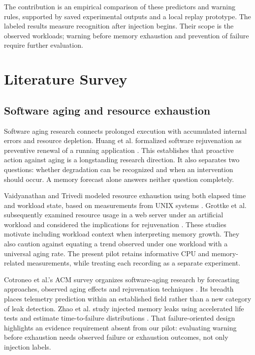 \documentclass[10pt,a4paper,twocolumn]{article}
\begin{document}
The contribution is an empirical comparison of these predictors and warning rules, supported by saved experimental outputs and a local replay prototype. The labeled results measure recognition after injection begins. Their scope is the observed workloads; warning before memory exhaustion and prevention of failure require further evaluation.

\section{Literature Survey}

\subsection{Software aging and resource exhaustion}

Software aging research connects prolonged execution with accumulated internal errors and resource depletion. Huang et al. formalized software rejuvenation as preventive renewal of a running application \cite{ref7}. This establishes that proactive action against aging is a longstanding research direction. It also separates two questions: whether degradation can be recognized and when an intervention should occur. A memory forecast alone answers neither question completely.

Vaidyanathan and Trivedi modeled resource exhaustion using both elapsed time and workload state, based on measurements from UNIX systems \cite{ref8}. Grottke et al. subsequently examined resource usage in a web server under an artificial workload and considered the implications for rejuvenation \cite{ref9}. These studies motivate including workload context when interpreting memory growth. They also caution against equating a trend observed under one workload with a universal aging rate. The present pilot retains informative CPU and memory-related measurements, while treating each recording as a separate experiment.

Cotroneo et al.'s ACM survey organizes software-aging research by forecasting approaches, observed aging effects and rejuvenation techniques \cite{ref10}. Its breadth places telemetry prediction within an established field rather than a new category of leak detection. Zhao et al. study injected memory leaks using accelerated life tests and estimate time-to-failure distributions \cite{ref11}. That failure-oriented design highlights an evidence requirement absent from our pilot: evaluating warning before exhaustion needs observed failure or exhaustion outcomes, not only injection labels.
\end{document}
